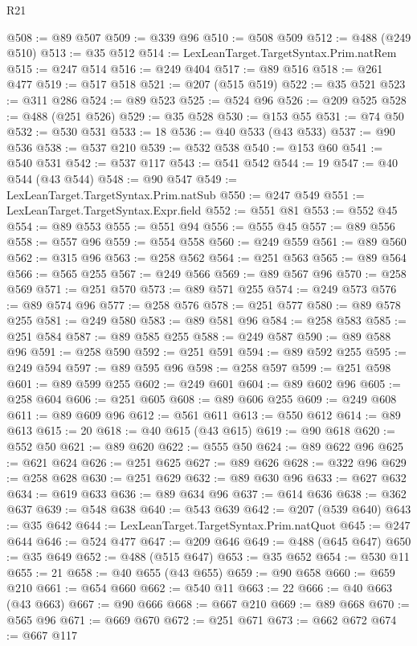 \begin{lexlean}{R21}
\begin{coremodule}
@508 := @89 @507
@509 := @339 @96
@510 := @508 @509
@512 := @488 (@249 @510)
@513 := @35 @512
@514 := LexLeanTarget.TargetSyntax.Prim.natRem
@515 := @247 @514
@516 := @249 @404
@517 := @89 @516
@518 := @261 @477
@519 := @517 @518
@521 := @207 (@515 @519)
@522 := @35 @521
@523 := @311 @286
@524 := @89 @523
@525 := @524 @96
@526 := @209 @525
@528 := @488 (@251 @526)
@529 := @35 @528
@530 := @153 @55
@531 := @74 @50
@532 := @530 @531
@533 := 18
@536 := @40 @533 (@43 @533)
@537 := @90 @536
@538 := @537 @210
@539 := @532 @538
@540 := @153 @60
@541 := @540 @531
@542 := @537 @117
@543 := @541 @542
@544 := 19
@547 := @40 @544 (@43 @544)
@548 := @90 @547
@549 := LexLeanTarget.TargetSyntax.Prim.natSub
@550 := @247 @549
@551 := LexLeanTarget.TargetSyntax.Expr.field
@552 := @551 @81
@553 := @552 @45
@554 := @89 @553
@555 := @551 @94
@556 := @555 @45
@557 := @89 @556
@558 := @557 @96
@559 := @554 @558
@560 := @249 @559
@561 := @89 @560
@562 := @315 @96
@563 := @258 @562
@564 := @251 @563
@565 := @89 @564
@566 := @565 @255
@567 := @249 @566
@569 := @89 @567 @96
@570 := @258 @569
@571 := @251 @570
@573 := @89 @571 @255
@574 := @249 @573
@576 := @89 @574 @96
@577 := @258 @576
@578 := @251 @577
@580 := @89 @578 @255
@581 := @249 @580
@583 := @89 @581 @96
@584 := @258 @583
@585 := @251 @584
@587 := @89 @585 @255
@588 := @249 @587
@590 := @89 @588 @96
@591 := @258 @590
@592 := @251 @591
@594 := @89 @592 @255
@595 := @249 @594
@597 := @89 @595 @96
@598 := @258 @597
@599 := @251 @598
@601 := @89 @599 @255
@602 := @249 @601
@604 := @89 @602 @96
@605 := @258 @604
@606 := @251 @605
@608 := @89 @606 @255
@609 := @249 @608
@611 := @89 @609 @96
@612 := @561 @611
@613 := @550 @612
@614 := @89 @613
@615 := 20
@618 := @40 @615 (@43 @615)
@619 := @90 @618
@620 := @552 @50
@621 := @89 @620
@622 := @555 @50
@624 := @89 @622 @96
@625 := @621 @624
@626 := @251 @625
@627 := @89 @626
@628 := @322 @96
@629 := @258 @628
@630 := @251 @629
@632 := @89 @630 @96
@633 := @627 @632
@634 := @619 @633
@636 := @89 @634 @96
@637 := @614 @636
@638 := @362 @637
@639 := @548 @638
@640 := @543 @639
@642 := @207 (@539 @640)
@643 := @35 @642
@644 := LexLeanTarget.TargetSyntax.Prim.natQuot
@645 := @247 @644
@646 := @524 @477
@647 := @209 @646
@649 := @488 (@645 @647)
@650 := @35 @649
@652 := @488 (@515 @647)
@653 := @35 @652
@654 := @530 @11
@655 := 21
@658 := @40 @655 (@43 @655)
@659 := @90 @658
@660 := @659 @210
@661 := @654 @660
@662 := @540 @11
@663 := 22
@666 := @40 @663 (@43 @663)
@667 := @90 @666
@668 := @667 @210
@669 := @89 @668
@670 := @565 @96
@671 := @669 @670
@672 := @251 @671
@673 := @662 @672
@674 := @667 @117

\end{coremodule}
\end{lexlean}
